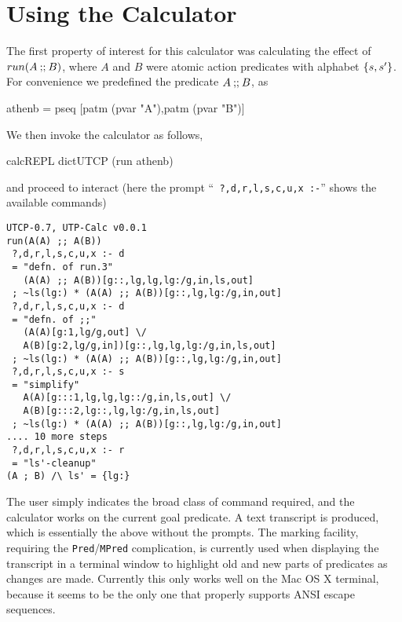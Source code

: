 \section{Using the Calculator}\label{sec:Using}

The first property of interest for this calculator
was calculating the effect of $run(A \mathbin{\mathbf{;\!;}} B)$,
where $A$ and $B$ were atomic action predicates with alphabet $\{{s,s'}\}$.
For convenience we predefined the predicate $A \mathbin{\mathbf{;\!;}} B$, as
\begin{code}
athenb = pseq [patm (pvar "A"),patm (pvar "B")]
\end{code}
We then invoke the calculator as follows,
\begin{code}
calcREPL dictUTCP (run athenb)
\end{code}
and proceed to interact
(here the prompt  ``\texttt{ ?,d,r,l,s,c,u,x :-}''
shows the available commands)
\begin{verbatim}
UTCP-0.7, UTP-Calc v0.0.1
run(A(A) ;; A(B))
 ?,d,r,l,s,c,u,x :- d
 = "defn. of run.3"
   (A(A) ;; A(B))[g::,lg,lg,lg:/g,in,ls,out]
 ; ~ls(lg:) * (A(A) ;; A(B))[g::,lg,lg:/g,in,out]
 ?,d,r,l,s,c,u,x :- d
 = "defn. of ;;"
   (A(A)[g:1,lg/g,out] \/
   A(B)[g:2,lg/g,in])[g::,lg,lg,lg:/g,in,ls,out]
 ; ~ls(lg:) * (A(A) ;; A(B))[g::,lg,lg:/g,in,out]
 ?,d,r,l,s,c,u,x :- s
 = "simplify"
   A(A)[g:::1,lg,lg,lg::/g,in,ls,out] \/
   A(B)[g:::2,lg::,lg,lg:/g,in,ls,out]
 ; ~ls(lg:) * (A(A) ;; A(B))[g::,lg,lg:/g,in,out]
.... 10 more steps
 ?,d,r,l,s,c,u,x :- r
 = "ls'-cleanup"
(A ; B) /\ ls' = {lg:}
\end{verbatim}
The user simply indicates the broad class of command required,
and the calculator works on the current goal predicate.
A text transcript is produced,
which is essentially the above
without the prompts.
The marking facility, requiring the \texttt{Pred}/\texttt{MPred} complication,
is currently used when displaying the transcript in a terminal
window to highlight old and new parts of predicates as changes are made.
Currently this only works well on the Mac OS X terminal,
because it seems to be the only one that properly supports ANSI escape sequences.
